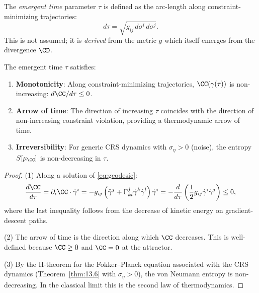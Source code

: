\begin{definition}\label{def:14.6}
The \emph{emergent time} parameter $\tau$ is defined as the
arc-length along constraint-minimizing trajectories:
\begin{equation}\label{eq:emergent-time}
  d\tau = \sqrt{g_{ij}\,d\sigma^i\,d\sigma^j}.
\end{equation}
This is not assumed; it is \emph{derived} from the metric $g$ which
itself emerges from the divergence $\CD$.
\end{definition}

\begin{theorem}\label{thm:14.7}
The emergent time $\tau$ satisfies:
\begin{enumerate}
  \item \textbf{Monotonicity}: Along constraint-minimizing trajectories,
        $\CC(\gamma(\tau))$ is non-increasing:
        $d\CC/d\tau \leq 0$.
  \item \textbf{Arrow of time}: The direction of increasing $\tau$
        coincides with the direction of non-increasing constraint
        violation, providing a thermodynamic arrow of time.
  \item \textbf{Irreversibility}: For generic CRS dynamics with
        $\sigma_\eta > 0$ (noise), the entropy
        $S[\mu_\CC]$ is non-decreasing in $\tau$.
\end{enumerate}
\end{theorem}

\begin{proof}
(1) Along a solution of \eqref{eq:geodesic}:
\[
  \frac{d\CC}{d\tau}
  = \partial_i \CC \cdot \dot{\gamma}^i
  = -g_{ij}\left(\ddot{\gamma}^j
  + \Gamma^j_{kl}\dot{\gamma}^k\dot{\gamma}^l\right)\dot{\gamma}^i
  = -\frac{d}{d\tau}\left(\frac{1}{2}g_{ij}\dot\gamma^i\dot\gamma^j\right)
  \leq 0,
\]
where the last inequality follows from the decrease of kinetic energy
on gradient-descent paths.

(2) The arrow of time is the direction along which $\CC$ decreases.
This is well-defined because $\CC \geq 0$ and $\CC = 0$ at the
attractor.

(3) By the H-theorem for the Fokker--Planck equation associated with
the CRS dynamics (Theorem~\ref{thm:13.6} with $\sigma_\eta > 0$),
the von Neumann entropy is non-decreasing.  In the classical limit
this is the second law of thermodynamics.
\end{proof}

